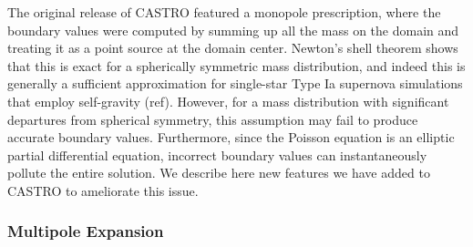 \documentclass[12pt,preprint]{aastex}
\begin{document}
The original release of CASTRO featured a monopole prescription, where the boundary values were computed by summing up all the mass on the domain and treating it as a point source at the domain center. Newton's shell theorem shows that this is exact for a spherically symmetric mass distribution, and indeed this is generally a sufficient approximation for single-star Type Ia supernova simulations that employ self-gravity (ref). However, for a mass distribution with significant departures from spherical symmetry, this assumption may fail to produce accurate boundary values. Furthermore, since the Poisson equation is an elliptic partial differential equation, incorrect boundary values can instantaneously pollute the entire solution. We describe here new features we have added to CASTRO to ameliorate this issue.

\subsubsection{Multipole Expansion}
\end{document}
